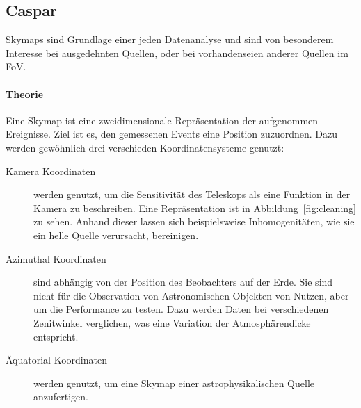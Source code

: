 \subsection{Caspar}%
\label{sub:caspar}

Skymaps sind Grundlage einer jeden Datenanalyse
und sind von besonderem Interesse bei ausgedehnten Quellen,
oder bei vorhandenseien anderer Quellen im FoV.

\paragraph{Theorie}%
\label{par:theorie}

Eine Skymap ist eine zweidimensionale Repräsentation der aufgenommen Ereignisse.
Ziel ist es, den gemessenen Events eine Position zuzuordnen.
Dazu werden ge\-wöhn\-lich drei verschieden Koordinatensysteme genutzt:

\begin{description}
  \item[\quad Kamera Koordinaten] werden genutzt, um die Sensitivität des
    Teleskops
    als eine Funktion in der Kamera zu beschreiben.
    Eine Repräsentation ist in Abbildung~\ref{fig:cleaning} zu sehen.
    Anhand dieser lassen sich beispielsweise Inhomogenitäten,
    wie sie ein helle Quelle verursacht, bereinigen.
  \item[\quad Azimuthal Koordinaten] sind abhängig von der Position des
    Beobachters auf der Erde.
    Sie sind nicht für die Observation von Astronomischen Objekten von Nutzen,
    aber um die Performance zu testen.
    Dazu werden Daten bei verschiedenen Zenitwinkel verglichen,
    was eine Variation der Atmosphärendicke entspricht.
  \item[\quad Äquatorial Koordinaten] werden genutzt, um eine Skymap einer astrophysikalischen Quelle anzufertigen.
\end{description}

